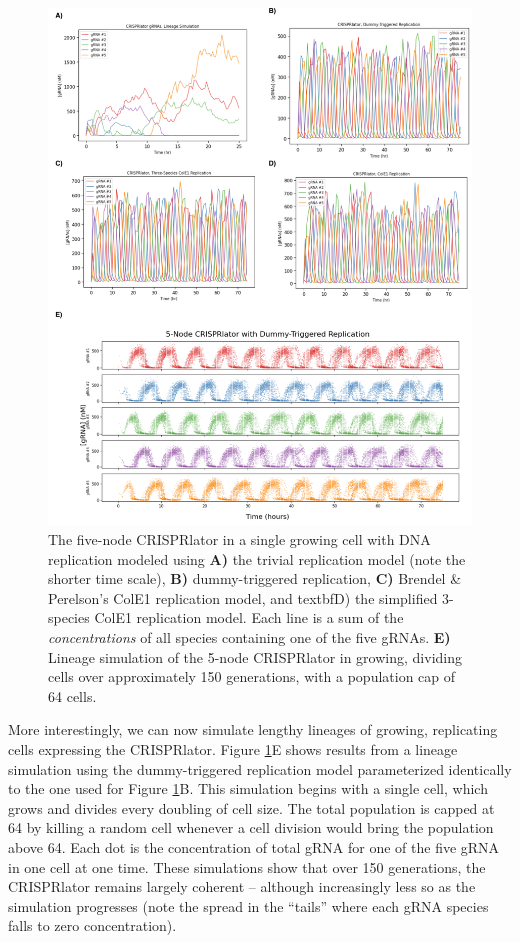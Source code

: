 \documentclass[preprint,12pt]{oldplainarticle}
\begin{document}
\begin{figure}[!ht]
\centering
\includegraphics[scale=1]{figures/crispr_results.png}
\caption{The five-node CRISPRlator in a single growing cell with DNA replication modeled using \textbf{A)} the trivial replication model (note the shorter time scale), \textbf{B)} dummy-triggered replication, \textbf{C)} Brendel \& Perelson's ColE1 replication model, and textbf{D)} the simplified 3-species ColE1 replication model. Each line is a sum of the \emph{concentrations} of all species containing one of the five gRNAs. \textbf{E)} Lineage simulation of the 5-node CRISPRlator in growing, dividing cells over approximately 150 generations, with a population cap of 64 cells.}
\label{fig:crispr_results}
\end{figure}

More interestingly, we can now simulate lengthy lineages of growing, replicating cells expressing the CRISPRlator. Figure \ref{fig:crispr_results}E shows results from a lineage simulation using the dummy-triggered replication model parameterized identically to the one used for Figure \ref{fig:crispr_results}B. This simulation begins with a single cell, which grows and divides every doubling of cell size. The total population is capped at 64 by killing a random cell whenever a cell division would bring the population above 64. Each dot is the concentration of total gRNA for one of the five gRNA in one cell at one time. These simulations show that over 150 generations, the CRISPRlator remains largely coherent -- although increasingly less so as the simulation progresses (note the spread in the ``tails'' where each gRNA species falls to zero concentration). 
\end{document}
